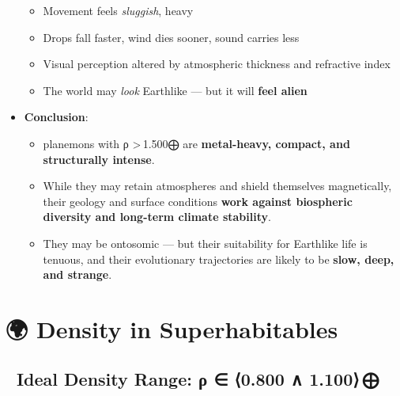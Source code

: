 \documentclass[
  letterpaper,
]{book}
\providecommand{\tightlist}{%
  \setlength{\itemsep}{0pt}\setlength{\parskip}{0pt}}
\begin{document}
\begin{itemize}
  \begin{itemize}
  \tightlist
  \item
    Movement feels \emph{sluggish}, heavy\\
  \item
    Drops fall faster, wind dies sooner, sound carries less\\
  \item
    Visual perception altered by atmospheric thickness and refractive
    index\\
  \item
    The world may \emph{look} Earthlike --- but it will \textbf{feel
    alien}
  \end{itemize}
\item
  \textbf{Conclusion}:

  \begin{itemize}
  \tightlist
  \item
    planemons with ρ \textgreater\,1.500⨁ are \textbf{metal-heavy,
    compact, and structurally intense}.
  \item
    While they may retain atmospheres and shield themselves
    magnetically, their geology and surface conditions \textbf{work
    against biospheric diversity and long-term climate stability}.
  \item
    They may be ontosomic --- but their suitability for Earthlike life
    is tenuous, and their evolutionary trajectories are likely to be
    \textbf{slow, deep, and strange}.
  \end{itemize}
\end{itemize}

\section{🌍 Density in
Superhabitables}\label{density-in-superhabitables}

\subsection{🧭 Ideal Density Range: ρ ∈ ⟨0.800 ∧
1.100⟩\,⨁}\label{ideal-density-range-ux3c1-0.800-1.100}
\end{document}

